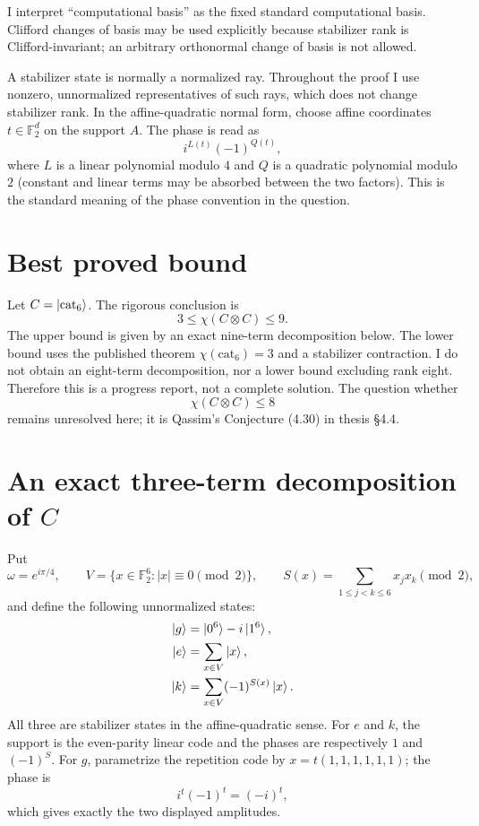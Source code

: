 \documentclass[11pt]{article}
\theoremstyle{definition}
\newcommand{\F}{\mathbb{F}}
\newcommand{\cat}{\mathrm{cat}}
\begin{document}
I interpret ``computational basis'' as the fixed standard computational basis. Clifford changes of basis may be used explicitly because stabilizer rank is Clifford-invariant; an arbitrary orthonormal change of basis is not allowed.

A stabilizer state is normally a normalized ray. Throughout the proof I use nonzero, unnormalized representatives of such rays, which does not change stabilizer rank. In the affine-quadratic normal form, choose affine coordinates $t\in\F_2^d$ on the support $A$. The phase is read as
\[
i^{L(t)}(-1)^{Q(t)},
\]
where $L$ is a linear polynomial modulo $4$ and $Q$ is a quadratic polynomial modulo $2$ (constant and linear terms may be absorbed between the two factors). This is the standard meaning of the phase convention in the question.

\section{Best proved bound}

Let $C=\ket{\cat_6}$. The rigorous conclusion is
\[
\boxed{3\leq\chi(C\otimes C)\leq9.}
\]
The upper bound is given by an exact nine-term decomposition below. The lower bound uses the published theorem $\chi(\cat_6)=3$ and a stabilizer contraction. I do not obtain an eight-term decomposition, nor a lower bound excluding rank eight. Therefore this is a progress report, not a complete solution. The question whether
\[
\chi(C\otimes C)\leq8
\]
remains unresolved here; it is Qassim's Conjecture (4.30) in thesis \S4.4.

\section{An exact three-term decomposition of $C$}

Put
\[
\omega=e^{i\pi/4},\qquad
V=\{x\in\F_2^6:|x|\equiv0\pmod2\},\qquad
S(x)=\sum_{1\leq j<k\leq6}x_jx_k\pmod2,
\]
and define the following unnormalized states:
\[
\begin{aligned}
\ket{g}&=\ket{0^6}-i\ket{1^6},\\
\ket{e}&=\sum_{x\in V}\ket{x},\\
\ket{k}&=\sum_{x\in V}(-1)^{S(x)}\ket{x}.
\end{aligned}
\]
All three are stabilizer states in the affine-quadratic sense. For $e$ and $k$, the support is the even-parity linear code and the phases are respectively $1$ and $(-1)^S$. For $g$, parametrize the repetition code by $x=t(1,1,1,1,1,1)$; the phase is
\[
i^t(-1)^t=(-i)^t,
\]
which gives exactly the two displayed amplitudes.
\end{document}

